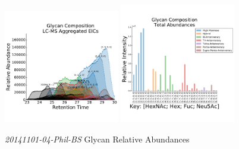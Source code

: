     \begin{figure}[!htbp]
        \centering
        \includegraphics[width=0.45\textwidth,valign=t]{figure/phil_bs_chromatograms.pdf}
        \includegraphics[width=0.45\textwidth,valign=t]{figure/phil_bs_abundances.pdf}
        \caption{\textit{20141101-04-Phil-BS} Glycan Relative Abundances}
        \label{fig:phil_bs_aggregated_eics}
    \end{figure}

